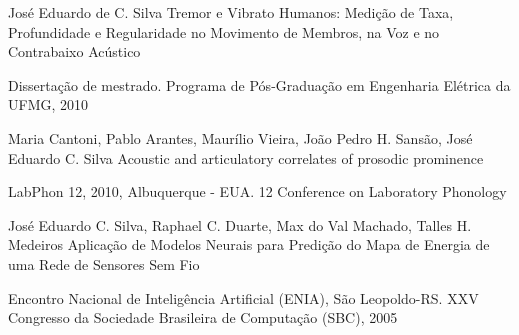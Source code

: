 \begin{cvpublications}
  \cvpublication
    {José Eduardo de C. Silva} %
    {Tremor e Vibrato Humanos: Medição de Taxa, Profundidade e Regularidade no Movimento de Membros, na Voz e no Contrabaixo Acústico} %
    {} %
    {} %
    {
      \begin{cvitems} %
        \item {Dissertação de mestrado. Programa de Pós-Graduação em Engenharia Elétrica da UFMG, 2010}
      \end{cvitems}
    }


  \cvpublication
    {Maria Cantoni, Pablo Arantes, Maurílio Vieira, João Pedro H. Sansão, José Eduardo C. Silva} %
    {Acoustic and articulatory correlates of prosodic prominence} %
    {} %
    {} %
    {
      \begin{cvitems} %
        \item {LabPhon 12, 2010, Albuquerque - EUA. 12 Conference on Laboratory Phonology}
      \end{cvitems}
    }


  \cvpublication
    {José Eduardo C. Silva, Raphael C. Duarte, Max do Val Machado, Talles H. Medeiros}
    {Aplicação de Modelos Neurais para Predição do Mapa de Energia de uma Rede de Sensores Sem Fio}
    {} %
    {}
    {
      \begin{cvitems} %
        \item {Encontro Nacional de Inteligência Artificial (ENIA), São Leopoldo-RS. XXV Congresso da Sociedade Brasileira de Computação (SBC), 2005}
      \end{cvitems}
    }



\end{cvpublications}
